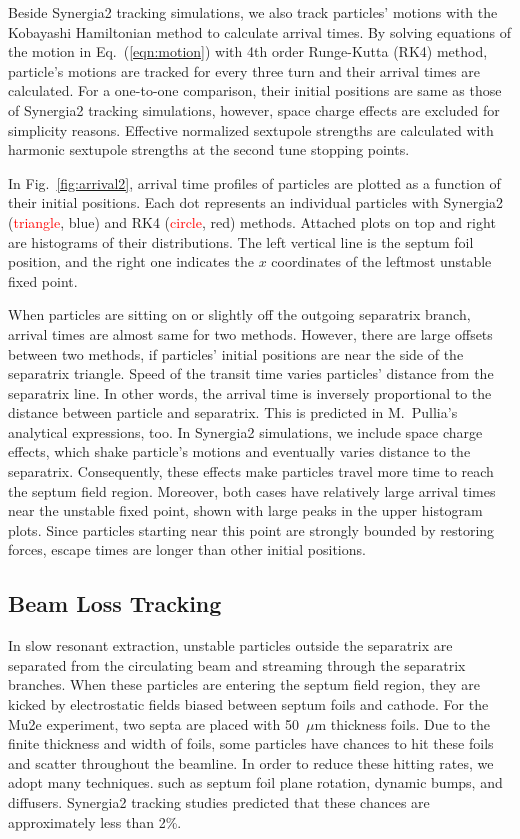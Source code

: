 \documentclass[aps,prstab,onecolumn,preprint]{revtex4-1}
\begin{document}
Beside Synergia2 tracking simulations, we also track particles' motions with the Kobayashi Hamiltonian method to calculate arrival times. By solving equations of the motion in Eq.~(\ref{eqn:motion}) with 4th order Runge-Kutta (RK4) method, particle's motions are tracked for every three turn and their arrival times are calculated. For a one-to-one comparison, their initial positions are same as those of Synergia2 tracking simulations, however, space charge effects are excluded for simplicity reasons. Effective normalized sextupole strengths are calculated with harmonic sextupole strengths at the second tune stopping points.

In Fig.~\ref{fig:arrival2}, arrival time profiles of particles are plotted as a function of their initial positions. Each dot represents an individual particles with Synergia2 (\textcolor{red}{triangle}, blue) and RK4 (\textcolor{red}{circle}, red) methods. Attached plots on top and right are histograms of their distributions. The left vertical line is the septum foil position, and the right one indicates the $x$ coordinates of the leftmost unstable fixed point. 

When particles are sitting on or slightly off the outgoing separatrix branch, arrival times are almost same for two methods. However, there are large offsets between two methods, if particles' initial positions are near the side of the separatrix triangle. Speed of the transit time varies particles' distance from the separatrix line. In other words, the arrival time is inversely proportional to the distance between particle and separatrix. This is predicted in M.~Pullia's analytical expressions, too. In Synergia2 simulations, we include space charge effects, which shake particle's motions and eventually varies distance to the separatrix. Consequently, these effects make particles travel more time to reach the septum field region. Moreover, both cases have relatively large arrival times near the unstable fixed point, shown with large peaks in the upper histogram plots. Since particles starting near this point are strongly bounded by restoring forces, escape times are longer than other initial positions. 


\subsection{\label{sec:beamloss}Beam Loss Tracking}

In slow resonant extraction, unstable particles outside the separatrix are separated from the circulating beam and streaming through the separatrix branches. When these particles are entering the septum field region, they are kicked by electrostatic fields biased between septum foils and cathode. For the Mu2e experiment, two septa are placed with 50~$\mu$m thickness foils. Due to the finite thickness and width of foils, some particles have chances to hit these foils and scatter throughout the beamline. In order to reduce these hitting rates, we adopt many techniques. such as septum foil plane rotation, dynamic bumps, and diffusers. Synergia2 tracking studies predicted that these chances are approximately less than 2\%. 
\end{document}

